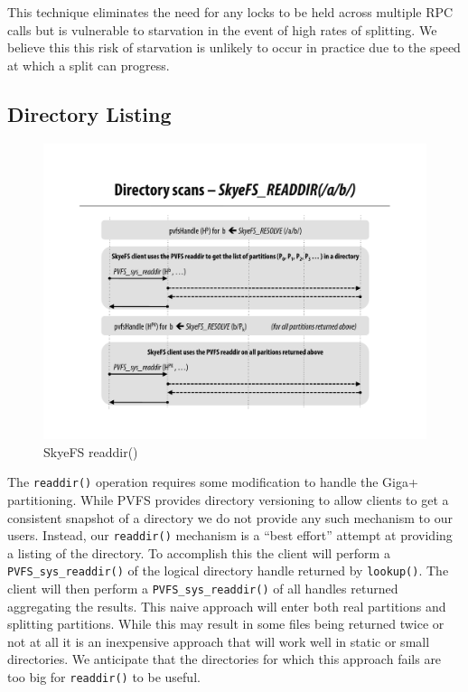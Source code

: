 \documentclass[twocolumn,letterpaper]{article}
\newcommand{\code}[1]{\texttt{#1}}
\begin{document}
This technique eliminates the need for any locks to be held across multiple RPC
calls but is vulnerable to starvation in the event of high rates of splitting.
We believe this this risk of starvation is unlikely to occur in practice due to
the speed at which a split can progress.

\subsection{Directory Listing}
\begin{figure}
\begin{center}
\includegraphics[scale=0.4]{figure-readdir}
\end{center}
\caption{SkyeFS readdir()}
\end{figure}
The \code{readdir()} operation requires some modification to handle the Giga+
partitioning.  While PVFS provides directory versioning to allow clients to
get a consistent snapshot of a directory we do not provide any such mechanism
to our users.  Instead, our \code{readdir()} mechanism is a ``best effort'' attempt
at providing a listing of the directory.  To accomplish this the client will
perform a \code{PVFS\_sys\_readdir()} of the logical directory handle returned by
\code{lookup()}.  The client will then perform a \code{PVFS\_sys\_readdir()} of all handles
returned aggregating the results.  This naive approach will enter both real
partitions and splitting partitions.  While this may result in some files
being returned twice or not at all it is an inexpensive approach that will
work well in static or small directories.  We anticipate that the directories
for which this approach fails are too big for \code{readdir()} to be useful.
\end{document}
